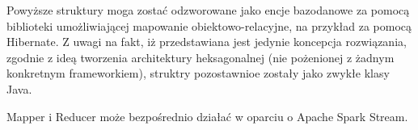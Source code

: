 









Powyższe struktury moga zostać odzworowane jako encje bazodanowe za pomocą biblioteki umożliwiającej mapowanie obiektowo-relacyjne, na przykład za pomocą Hibernate. Z uwagi na fakt, iż przedstawiana jest jedynie koncepcja rozwiązania, zgodnie z ideą tworzenia architektury heksagonalnej (nie pożenionej z żadnym konkretnym frameworkiem), struktry pozostawnioe zostały jako zwykłe klasy Java.

Mapper i Reducer może bezpośrednio działać w oparciu o Apache Spark Stream.
